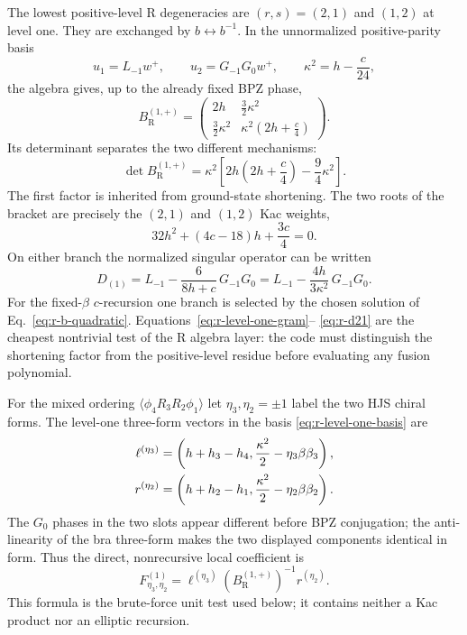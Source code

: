 \documentclass[11pt]{article}
\newcommand{\R}{\mathrm{R}}
\begin{document}
The lowest positive-level R degeneracies are $(r,s)=(2,1)$ and $(1,2)$ at
level one.  They are exchanged by $b\leftrightarrow b^{-1}$.  In
the unnormalized positive-parity basis
\begin{equation}
 u_1=L_{-1}w^+,\qquad u_2=G_{-1}G_0w^+,
 \qquad \kappa^2=h-\frac{c}{24},
 \label{eq:r-level-one-basis}
\end{equation}
the algebra gives, up to the already fixed BPZ phase,
\begin{equation}
 B_{\R}^{(1,+)}
 =
 \begin{pmatrix}
 2h & \frac32\kappa^2\\[0.2em]
 \frac32\kappa^2 & \kappa^2\left(2h+\frac c4\right)
 \end{pmatrix}.
 \label{eq:r-level-one-gram}
\end{equation}
Its determinant separates the two different mechanisms:
\begin{equation}
 \det B_{\R}^{(1,+)}
 =\kappa^2
 \left[
 2h\left(2h+\frac c4\right)-\frac94\kappa^2
 \right].
 \label{eq:r-level-one-det}
\end{equation}
The first factor is inherited from ground-state shortening.  The two roots
of the bracket are precisely the $(2,1)$ and $(1,2)$ Kac weights,
\begin{equation}
 32h^2+(4c-18)h+\frac{3c}{4}=0.
 \label{eq:r-21-kac}
\end{equation}
On either branch the normalized singular operator can be written
\begin{equation}
 D_{(1)}
 =L_{-1}-\frac{6}{8h+c}\,G_{-1}G_0
 =L_{-1}-\frac{4h}{3\kappa^2}\,G_{-1}G_0.
 \label{eq:r-d21}
\end{equation}
For the fixed-\(\beta\) \(c\)-recursion one branch is selected by the chosen
solution of Eq.~\eqref{eq:r-b-quadratic}.
Equations~\eqref{eq:r-level-one-gram}--
\eqref{eq:r-d21} are the cheapest
nontrivial test of the R algebra layer: the code must distinguish the
shortening factor from the positive-level residue before evaluating any
fusion polynomial.

For the mixed ordering
$\langle\phi_4 R_3 R_2\phi_1\rangle$ let
$\eta_3,\eta_2=\pm1$ label the two HJS chiral forms.  The level-one
three-form vectors in the basis \eqref{eq:r-level-one-basis} are
\begin{align}
 \ell^{(\eta_3)}
 &=\left(h+h_3-h_4,
          \frac{\kappa^2}{2}-\eta_3\beta\beta_3\right),
 \notag\\
 r^{(\eta_2)}
 &=\left(h+h_2-h_1,
          \frac{\kappa^2}{2}-\eta_2\beta\beta_2\right).
 \label{eq:r-level-one-vertices}
\end{align}
The $G_0$ phases in the two slots appear different before BPZ conjugation;
the anti-linearity of the bra three-form makes the two displayed components
identical in form.  Thus the direct, nonrecursive local coefficient is
\begin{equation}
 F^{(1)}_{\eta_3,\eta_2}
 =\ell^{(\eta_3)}
  \left(B_{\R}^{(1,+)}\right)^{-1}
  r^{(\eta_2)}.
 \label{eq:r-level-one-direct-block}
\end{equation}
This formula is the brute-force unit test used below; it contains neither a
Kac product nor an elliptic recursion.
\end{document}
